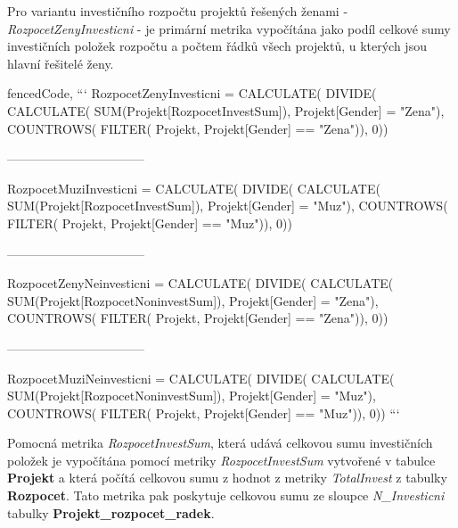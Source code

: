 \documentclass[
  digital,     %
  twoside,     %
  lof,         %
  lot,         %
]{fithesis4}
\begin{document}
Pro variantu investičního rozpočtu projektů řešených ženami - \emph{RozpocetZenyInvesticni} - je primární metrika vypočítána jako podíl celkové sumy investičních položek rozpočtu a počtem řádků všech projektů, u kterých jsou hlavní řešitelé ženy.
\begin{markdown*}{%
  fencedCode,
}
```
RozpocetZenyInvesticni =                    
    CALCULATE(
        DIVIDE(
            CALCULATE(
                SUM(Projekt[RozpocetInvestSum]),
                Projekt[Gender] = "Zena"),
            COUNTROWS(
                FILTER(
                    Projekt,
                    Projekt[Gender] == "Zena")),
                0))

––––––––––––––––––––––

RozpocetMuziInvesticni =                    
    CALCULATE(
        DIVIDE(
            CALCULATE(
                SUM(Projekt[RozpocetInvestSum]),
                Projekt[Gender] = "Muz"),
            COUNTROWS(
                FILTER(
                    Projekt,
                    Projekt[Gender] == "Muz")),
                0))

––––––––––––––––––––––

RozpocetZenyNeinvesticni =                    
    CALCULATE(
        DIVIDE(
            CALCULATE(
                SUM(Projekt[RozpocetNoninvestSum]),
                Projekt[Gender] = "Zena"),
            COUNTROWS(
                FILTER(
                    Projekt,
                    Projekt[Gender] == "Zena")),
                0))

––––––––––––––––––––––

RozpocetMuziNeinvesticni =                    
    CALCULATE(
        DIVIDE(
            CALCULATE(
                SUM(Projekt[RozpocetNoninvestSum]),
                Projekt[Gender] = "Muz"),
            COUNTROWS(
                FILTER(
                    Projekt,
                    Projekt[Gender] == "Muz")),
                0))
```
\end{markdown*}

Pomocná metrika \emph{RozpocetInvestSum}, která udává celkovou sumu investičních položek je vypočítána pomocí metriky \emph{RozpocetInvestSum} vytvořené v tabulce \textbf{Projekt} a která počítá celkovou sumu z hodnot z metriky \emph{TotalInvest} z tabulky \textbf{Rozpocet}. Tato metrika pak poskytuje celkovou sumu ze sloupce \emph{N\_Investicni} tabulky \textbf{Projekt\_rozpocet\_radek}.
\end{document}
